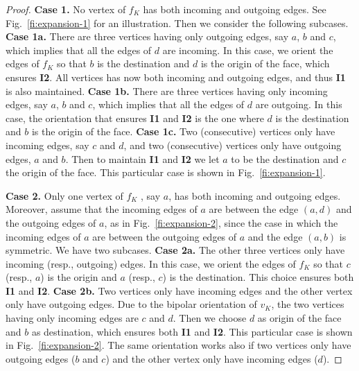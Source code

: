 \documentclass[a4paper]{article}
\begin{document}
\begin{proof}
{\noindent \bf Case 1.} No vertex of $f_K$ has both incoming and outgoing edges. See Fig.~\ref{fi:expansion-1} for an illustration. Then we consider the following subcases. {\bf Case 1a.} There are three vertices having only outgoing edges, say $a$, $b$ and $c$, which implies that all the edges of $d$ are incoming. In this case, we orient the edges of $f_K$ so that $b$ is the destination and $d$ is the origin of the face, which ensures {\bf I2}. All vertices has now both incoming and outgoing edges, and thus {\bf I1} is also maintained. 
{\bf Case 1b.} There are three vertices having only incoming edges, say $a$, $b$ and $c$, which implies that all the edges of $d$ are outgoing. In this case, the orientation that ensures {\bf I1} and {\bf I2} is the one where $d$ is the destination and $b$ is the origin of the face. 
{\bf Case 1c.} Two (consecutive) vertices only have incoming edges, say $c$ and $d$, and two (consecutive) vertices only have outgoing edges, $a$ and $b$.  Then to maintain {\bf I1} and {\bf I2} we let $a$ to be the destination and $c$ the origin of the face. This particular case is shown in Fig.~\ref{fi:expansion-1}. 

\medskip

{\noindent \bf Case 2.} Only one vertex of $f_K$ , say $a$, has both incoming and outgoing edges. Moreover, assume that the incoming edges of $a$ are between the edge $(a,d)$ and the outgoing edges of $a$, as in Fig.~\ref{fi:expansion-2}, since the case in which the incoming edges of $a$ are between the outgoing edges of $a$ and the edge $(a,b)$ is symmetric. We have two subcases. 
{\bf Case 2a.} The other three vertices only have incoming (resp., outgoing) edges. In this case,  we orient the edges of $f_K$ so that $c$ (resp., $a$) is the origin and $a$ (resp., $c$) is the destination. This choice ensures both {\bf I1} and {\bf I2}. 
{\bf Case 2b.} Two vertices only have incoming edges and the other vertex only have outgoing edges. Due to the bipolar orientation of $v_K$, the two vertices having only incoming edges are $c$ and $d$. Then we choose $d$ as origin of the face and $b$ as destination, which ensures both {\bf I1} and {\bf I2}. This particular case is shown in Fig.~\ref{fi:expansion-2}. The same orientation works also if two vertices only have outgoing edges ($b$ and $c$) and the other vertex only have incoming edges ($d$).

\medskip


\end{proof}
\end{document}
